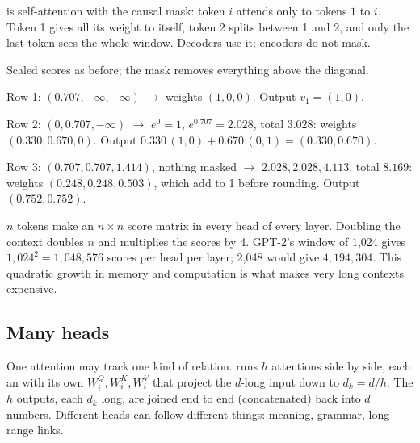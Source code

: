 \begin{definition}
 is self-attention with the causal mask: token $i$ attends only to tokens $1$ to $i$. Token 1 gives all its weight to itself, token 2 splits between 1 and 2, and only the last token sees the whole window. Decoders use it; encoders do not mask.
\end{definition}

\begin{example}
Scaled scores as before; the mask removes everything above the diagonal.
\begin{steps}
  \item Row 1: $(0.707, -\infty, -\infty)$ $\to$ weights $(1, 0, 0)$. Output $v_1 = (1, 0)$.
  \item Row 2: $(0, 0.707, -\infty)$ $\to$ $e^0 = 1$, $e^{0.707} = 2.028$, total $3.028$: weights $(0.330, 0.670, 0)$. Output $0.330\,(1, 0) + 0.670\,(0, 1) = (0.330, 0.670)$.
  \item Row 3: $(0.707, 0.707, 1.414)$, nothing masked $\to$ $2.028, 2.028, 4.113$, total $8.169$: weights $(0.248, 0.248, 0.503)$, which add to 1 before rounding. Output $(0.752, 0.752)$.
\end{steps}
\end{example}

\begin{result}
$n$ tokens make an $n \times n$ score matrix in every head of every layer. Doubling the context doubles $n$ and multiplies the scores by 4. GPT-2's window of 1,024 gives $1{,}024^2 = 1{,}048{,}576$ scores per head per layer; 2,048 would give $4{,}194{,}304$. This quadratic growth in memory and computation is what makes very long contexts expensive.
\end{result}

\subsection*{Many heads}

\begin{definition}
One attention may track one kind of relation.  runs $h$ attentions side by side, each an  with its own $W^Q_i, W^K_i, W^V_i$ that project the $d$-long input down to $d_k = d/h$. The $h$ outputs, each $d_k$ long, are joined end to end (concatenated) back into $d$ numbers. Different heads can follow different things: meaning, grammar, long-range links.
\end{definition}

